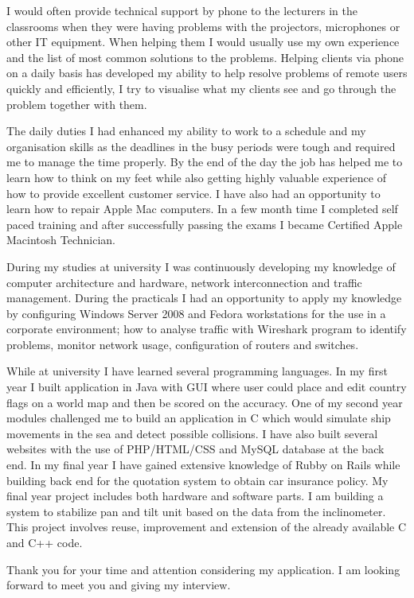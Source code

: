 \documentclass[11pt,a4paper,sans]{moderncv}        %
\begin{document}
I would often provide technical support by phone to the lecturers in the classrooms when they were having problems with the projectors, microphones or other IT  equipment. When helping them I would usually use my own experience and the list of most common solutions to the problems. Helping clients via phone on a daily basis has developed my ability to help resolve problems of remote users quickly and efficiently, I try to visualise what my clients see and go through the problem together with them.

The daily duties I had enhanced my ability to work to a schedule and my organisation skills as the deadlines in the busy periods were tough and required me to manage the time properly. By the end of the day the job has helped me to learn how to think on my feet while also getting highly valuable experience of how to provide excellent customer service. I have also had an opportunity to learn how to repair Apple Mac computers. In a few month time I completed self paced training and after successfully passing the exams I became Certified Apple Macintosh Technician.

During my studies at university I was continuously developing my knowledge of computer architecture and hardware, network interconnection and traffic management. During the practicals I had an opportunity to apply my knowledge by configuring Windows Server 2008 and Fedora workstations for the use in a corporate environment; how to analyse traffic with Wireshark program to identify problems, monitor network usage, configuration of routers and switches. 

While at university I have learned several programming languages. In my first year I built application in Java with GUI where user could place and edit country flags on a world map and then be scored on the accuracy. One of my second year modules challenged me to build an application in C which would simulate ship movements in the sea and detect possible collisions. I have also built several websites with the use of PHP/HTML/CSS and MySQL database at the back end. In my final year I have gained extensive knowledge of Rubby on Rails while building back end for the quotation system to obtain car insurance policy. My final year project includes both hardware and software parts. I am building a system to stabilize pan and tilt unit based on the data from the inclinometer. This project involves reuse, improvement and extension of the already available C and C++ code.

Thank you for your time and attention considering my application. I am
looking forward to meet you and giving my interview.

\makeletterclosing
\end{document}
